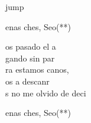\begin{cancion}jump\\
	\begin{chorus}%
		enas ches, Seo(**)\jump\\
	\end{chorus}%
	os pasado el a \\
	gando sin par \\
	ra estamos canos,\\
	os a descanr\\
	s no me olvido de deci \jump\\
	\begin{chorus}%
		enas ches, Seo(**)\jump\\
	\end{chorus}%
\end{cancion}%
